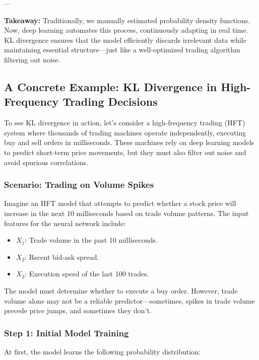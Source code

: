 ---

\textbf{Takeaway:} Traditionally, we manually estimated probability density functions. Now, deep learning automates this process, continuously adapting in real time. KL divergence ensures that the model efficiently discards irrelevant data while maintaining essential structure—just like a well-optimized trading algorithm filtering out noise.



\subsection{A Concrete Example: KL Divergence in High-Frequency Trading Decisions}

To see KL divergence in action, let’s consider a high-frequency trading (HFT) system where thousands of trading machines operate independently, executing buy and sell orders in milliseconds. These machines rely on deep learning models to predict short-term price movements, but they must also filter out noise and avoid spurious correlations.

\subsubsection*{Scenario: Trading on Volume Spikes}

Imagine an HFT model that attempts to predict whether a stock price will increase in the next 10 milliseconds based on trade volume patterns. The input features for the neural network include:

\begin{itemize}
    \item \( X_1 \): Trade volume in the past 10 milliseconds.
    \item \( X_2 \): Recent bid-ask spread.
    \item \( X_3 \): Execution speed of the last 100 trades.
\end{itemize}

The model must determine whether to execute a buy order. However, trade volume alone may not be a reliable predictor—sometimes, spikes in trade volume precede price jumps, and sometimes they don’t.

\subsubsection*{Step 1: Initial Model Training}

At first, the model learns the following probability distribution:

